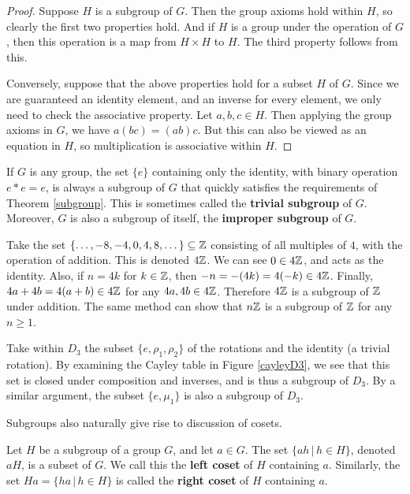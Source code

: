 \begin{proof}
Suppose $H$ is a subgroup of $G$. Then the group axioms hold within $H$, so clearly the first two properties hold. And if $H$ is a group under the operation of $G$, then this operation is a map from $H \times H$ to $H$. The third property follows from this.

Conversely, suppose that the above properties hold for a subset $H$ of $G$. Since we are guaranteed an identity element, and an inverse for every element, we only need to check the associative property. Let $a, b, c \in H$. Then applying the group axioms in $G$, we have $a(bc) = (ab)c$. But this can also be viewed as an equation in $H$, so multiplication is associative within $H$.

\end{proof}

\begin{example}
If $G$ is any group, the set $\{e\}$ containing only the identity, with binary operation $e*e = e$, is always a subgroup of $G$ that quickly satisfies the requirements of Theorem \ref{subgroup}. This is sometimes called the \textbf{trivial subgroup} of $G$. Moreover, $G$ is also a subgroup of itself, the \textbf{improper subgroup} of $G$.
\end{example}

\begin{example}
\label{4z}
Take the set $\{\dots, -8, -4, 0, 4, 8, \dots\} \subseteq \mathbb{Z}$ consisting of all multiples of $4$, with the operation of addition. This is denoted $4\mathbb{Z}$. We can see $0 \in 4\mathbb{Z}$, and acts as the identity. Also, if $n = 4k$ for $k \in \mathbb{Z}$, then $-n = -(4k) = 4(-k) \in 4\mathbb{Z}$. Finally, $4a + 4b = 4(a+b) \in 4\mathbb{Z}$ for any $4a, 4b \in 4\mathbb{Z}$. Therefore $4\mathbb{Z}$ is a subgroup of $\mathbb{Z}$ under addition. The same method can show that $n\mathbb{Z}$ is a subgroup of $\mathbb{Z}$ for any $n \geq 1$.
\end{example}

\begin{example}
Take within $D_3$ the subset $\{e, \rho_1, \rho_2\}$ of the rotations and the identity (a trivial rotation). By examining the Cayley table in Figure \ref{cayleyD3}, we see that this set is closed under composition and inverses, and is thus a subgroup of $D_3$. By a similar argument, the subset $\{e, \mu_1\}$ is also a subgroup of $D_3$.
\end{example}

Subgroups also naturally give rise to discussion of cosets.

\begin{definition}
Let $H$ be a subgroup of a group $G$, and let $a \in G$. The set $\{ah \,|\, h \in H\}$, denoted $aH$, is a subset of $G$. We call this the \textbf{left coset} of $H$ containing $a$. Similarly, the set $Ha = \{ha \,|\, h \in H\}$ is called the \textbf{right coset} of $H$ containing $a$.
\end{definition}

